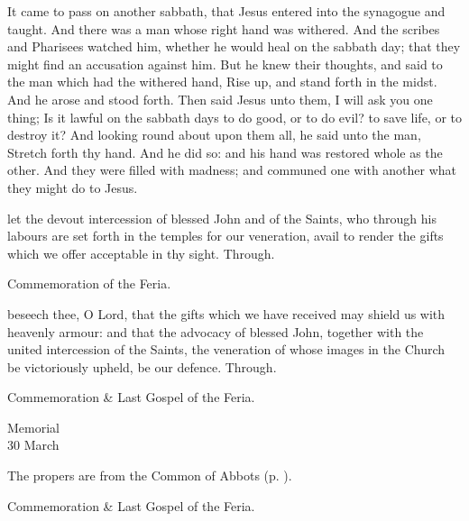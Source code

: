 It came to pass on another sabbath, that Jesus entered into the synagogue and taught. And there was a man whose right hand was withered. And the scribes and Pharisees watched him, whether he would heal on the sabbath day; that they might find an accusation against him. But he knew their thoughts, and said to the man which had the withered hand, Rise up, and stand forth in the midst. And he arose and stood forth. Then said Jesus unto them, I will ask you one thing; Is it lawful on the sabbath days to do good, or to do evil? to save life, or to destroy it? And looking round about upon them all, he said unto the man, Stretch forth thy hand. And he did so: and his hand was restored whole as the other. And they were filled with madness; and communed one with another what they might do to Jesus.


\secret
{} let the devout intercession of blessed John and of the Saints, who through his labours are set forth in the temples for our veneration, avail to render the gifts which we offer acceptable in thy sight. Through.

\begin{rubric}
	Commemoration of the Feria.
\end{rubric}


\postcommunion
{} beseech thee, O Lord, that the gifts which we have received may shield us with heavenly armour: and that the advocacy of blessed John, together with the united intercession of the Saints, the veneration of whose images in the Church be victoriously upheld, be our defence. Through.

\begin{rubric}
	Commemoration \& Last Gospel of the Feria.
\end{rubric}


\begin{inhead}
    {Memorial\\
30 March}
\end{inhead}

\begin{rubric}
	The propers are from the Common of Abbots (p. \pageref{CommonAbbots}).
\end{rubric}
\begin{rubric}
	Commemoration \& Last Gospel of the Feria.
\end{rubric}


